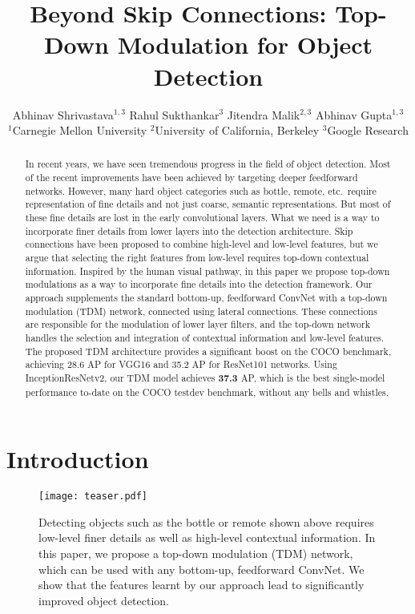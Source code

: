 \documentclass[10pt,twocolumn,letterpaper]{article}
\begin{document}
\title{Beyond Skip Connections: Top-Down Modulation for Object Detection}

\author{}
\author{Abhinav Shrivastava$^{1,3}$ \quad\quad Rahul Sukthankar$^3$ \quad\quad Jitendra Malik$^{2,3}$ \quad\quad Abhinav Gupta$^{1,3}$\\[0.1in]
$^1$Carnegie Mellon University \quad
$^2$University of California, Berkeley \quad
$^3$Google Research
\\}


\maketitle
\begin{abstract}
In recent years, we have seen tremendous progress in the field of object detection. Most of the recent improvements have been achieved by targeting deeper feedforward networks. However, many hard object categories such as bottle, remote, etc.\ require representation of fine details and not just coarse, semantic representations. But most of these fine details are lost in the early convolutional layers. What we need is a way to incorporate finer details from lower layers into the detection architecture. Skip connections have been proposed to combine high-level and low-level features, but we argue that selecting the right features from low-level requires top-down contextual information. Inspired by the human visual pathway, in this paper we propose top-down modulations as a way to incorporate fine details into the detection framework. Our approach supplements the standard bottom-up, feedforward ConvNet with a top-down modulation (TDM) network, connected using lateral connections. 
These connections are responsible for the modulation of lower layer filters, and the top-down network handles the selection and integration of contextual information and low-level features. The proposed TDM architecture provides a significant boost on the COCO benchmark, achieving 28.6 AP for VGG16 and 35.2 AP for ResNet101 networks. 
Using InceptionResNetv2, our TDM model achieves \textbf{37.3} AP, which is the best single-model performance to-date on the COCO testdev benchmark, without any bells and whistles.
\vspace{-0.1in}
\end{abstract}

\section{Introduction}\label{sec:intro}
\begin{figure}
    \centering
    \texttt{[image: teaser.pdf]}
    \caption{Detecting objects such as the bottle or remote shown above requires low-level finer details as well as high-level contextual information. In this paper, we propose a top-down modulation (TDM) network, which can be used with any bottom-up, feedforward ConvNet. We show that the features learnt by our approach lead to significantly improved object detection.}
    \label{fig:bottleRemote}
    \vspace{-0.2in}
\end{figure}
\end{document}
